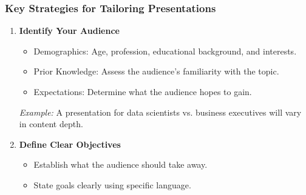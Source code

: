 \documentclass[aspectratio=169]{beamer}
\begin{document}
\begin{frame}[fragile]
    \frametitle{Key Strategies for Tailoring Presentations}
    \begin{enumerate}
        \item \textbf{Identify Your Audience}
            \begin{itemize}
                \item Demographics: Age, profession, educational background, and interests.
                \item Prior Knowledge: Assess the audience's familiarity with the topic.
                \item Expectations: Determine what the audience hopes to gain.
            \end{itemize}
            \textit{Example:} A presentation for data scientists vs. business executives will vary in content depth.
        
        \item \textbf{Define Clear Objectives}
            \begin{itemize}
                \item Establish what the audience should take away.
                \item State goals clearly using specific language.
            \end{itemize}
    \end{enumerate}
\end{frame}
\end{document}
